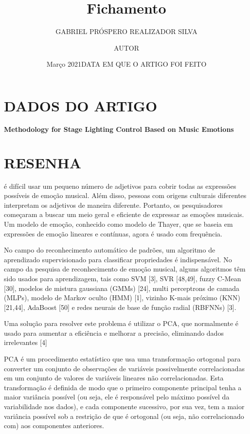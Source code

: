 \documentclass{article}
\title{Fichamento}
\author{GABRIEL PRÓSPERO REALIZADOR  SILVA}
\date{Março 2021}
\begin{document}
\maketitle

\section{DADOS DO ARTIGO}
\textbf{Methodology for Stage Lighting Control Based on Music Emotions \\}
\author{AUTOR \\}
\date{DATA EM QUE O ARTIGO FOI FEITO}

\section{RESENHA}
é difícil usar um pequeno número de adjetivos para cobrir todas as expressões possíveis de emoção musical. Além disso, pessoas com origens culturais diferentes interpretam os adjetivos de maneira diferente. Portanto, os pesquisadores começaram a buscar um meio geral e eficiente de expressar as emoções musicais. Um modelo de emoção, conhecido como modelo de Thayer, que se baseia em expressões de emoção lineares e contínuas, agora é usado com frequência.

No campo do reconhecimento automático de padrões, um algoritmo de aprendizado supervisionado para classificar propriedades é indispensável. No campo da pesquisa de reconhecimento de emoção musical, alguns algoritmos têm sido usados ​​para aprendizagem, tais como SVM [3], SVR [48,49], fuzzy C-Mean [30], modelos de mistura gaussiana (GMMs) [24], multi perceptrons de camada (MLPs), modelo de Markov oculto (HMM) [1], vizinho K-mais próximo (KNN) [21,44], AdaBoost [50] e redes neurais de base de função radial (RBFNNs) [3].

Uma solução para resolver este problema é utilizar o PCA, que normalmente é usado para aumentar a eficiência e melhorar a precisão, eliminando dados irrelevantes [4]

PCA é um procedimento estatístico que usa uma transformação ortogonal para converter um conjunto de observações de variáveis ​​possivelmente correlacionadas em um conjunto de valores de variáveis ​​lineares não correlacionadas.
Esta transformação é definida de modo que o primeiro componente principal tenha a maior variância possível (ou seja, ele é responsável pelo máximo possível da variabilidade nos dados), e cada componente sucessivo, por sua vez, tem a maior variância possível sob a restrição de que é ortogonal (ou seja, não correlacionado com) aos componentes anteriores.
\end{document}
